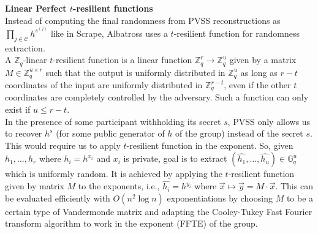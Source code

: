 \documentclass[letterpaper,twocolumn,10pt]{article}
\theoremstyle{definition}
\theoremstyle{remark}
\begin{document}
\noindent\textbf{Linear Perfect $t$-resilient functions}\\
Instead of computing the final randomness from PVSS reconstructions as $\prod_{j \in \mathcal{C}} h^{s^{(j)}}$ like in Scrape, Albatross uses a $t$-resilient function for randomness extraction.\\
A $\mathbb{Z}_q$-linear $t$-resilient function is a linear function $\mathbb{Z}_q^r \rightarrow \mathbb{Z}_q^u$ given by a matrix $M \in \mathbb{Z}_q^{u \times r}$ such that the output is uniformly distributed in $\mathbb{Z}_q^u$ as long as $r-t$ coordinates of the input are uniformly distributed in $\mathbb{Z}_q^{r-t}$, even if the other $t$ coordinates are completely controlled by the adversary. Such a function can only exist if $u \le r-t$.\\
In the presence of some participant withholding its secret $s$, PVSS only allows us to recover $h^s$ (for some public generator of $h$ of the group) instead of the secret $s$. This would require us to apply $t$-resilient function in the exponent. So, given $h_1, \ldots, h_r$ where $h_i = h^{x_i}$ and $x_i$ is private, goal is to extract $(\hat{h_1},\ldots, \hat{h_u}) \in \mathbb{G}_q^u$ which is uniformly random. It is achieved by applying the $t$-resilient function given by matrix $M$ to the exponents, i.e., $\hat{h_i} = h^{y_i}$ where $\vec{x} \mapsto \vec{y} = M \cdot \vec{x}$. This can be evaluated efficiently with $O(n^2 \log n)$ exponentiations by choosing $M$ to be a certain type of Vandermonde matrix and adapting the Cooley-Tukey Fast Fourier transform algorithm to work in the exponent (FFTE) \cite{cascudo2020albatross} of the group.\\
\end{document}
